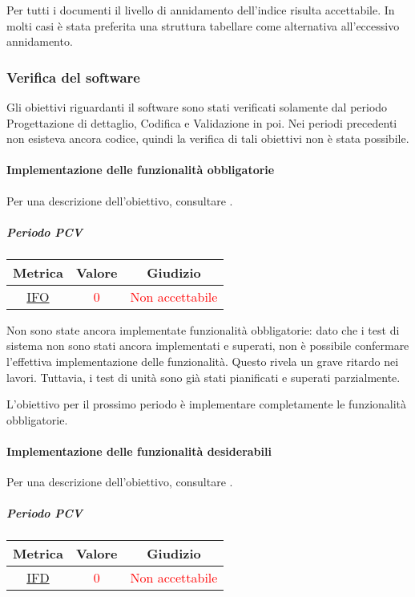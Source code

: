 					Per tutti i documenti il livello di annidamento dell'indice risulta accettabile. In molti casi è stata preferita una struttura tabellare come alternativa all'eccessivo annidamento.
					
		\subsubsection{Verifica del software}
			Gli obiettivi riguardanti il software sono stati verificati solamente dal periodo Progettazione di dettaglio, Codifica e Validazione in poi. Nei periodi precedenti non esisteva ancora codice, quindi la verifica di tali obiettivi non è stata possibile.
			
			\paragraph{Implementazione delle funzionalità obbligatorie}
			Per una descrizione dell'obiettivo, consultare .
				\subparagraph{Periodo PCV}
			\begin{table}[H]
				\centering
				\begin{tabular}{  c | c | c}
					\hline
					\textbf{Metrica} & \textbf{Valore} & \textbf{Giudizio} \\
					\hline
					\hyperref[MMC]{IFO}   & \textcolor{Red}{0}          & \textcolor{Red}{Non accettabile}  \\ \hline
				\end{tabular} 
			\end{table}
					Non sono state ancora implementate funzionalità obbligatorie: dato che i test di sistema non sono stati ancora implementati e superati, non è possibile confermare l'effettiva implementazione delle funzionalità. Questo rivela un grave ritardo nei lavori. Tuttavia, i test di unità sono già stati pianificati e superati parzialmente. 
					
					L'obiettivo per il prossimo periodo è implementare completamente le funzionalità obbligatorie.
			
			\newpage
			\paragraph{Implementazione delle funzionalità desiderabili}
			Per una descrizione dell'obiettivo, consultare .
				\subparagraph{Periodo PCV}
				
				\begin{table}[H]
					\centering
					\begin{tabular}{  c | c | c}
						\hline
						\textbf{Metrica} & \textbf{Valore} & \textbf{Giudizio} \\
						\hline
						\hyperref[MMC]{IFD}   & \textcolor{Red}{0}          & \textcolor{Red}{Non accettabile}  \\ \hline
					\end{tabular} 
				\end{table}
			
